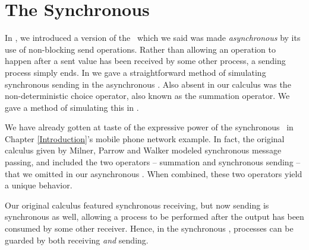 \chapter{The Synchronous \Picalc}\label{sync_and_express}
In , we introduced a version of the \picalc\ which we said was made \emph{asynchronous} by its use of non-blocking send operations.  
Rather than allowing an operation to happen after a sent value has been received by some other process, a sending process simply ends.  
In  we gave a straightforward method of simulating synchronous sending in the asynchronous \picalc.  
Also absent in our calculus was the non-deterministic choice operator, also known as the summation operator.  
We gave a method of simulating this in .

We have already gotten at taste of the expressive power of the synchronous \picalc\ in Chapter \ref{Introduction}'s mobile phone network example.  In fact, the original calculus given by Milner, Parrow and Walker modeled synchronous message passing, and included the two operators -- summation and synchronous sending -- that we omitted in our asynchronous \picalc.  
When combined, these two operators yield a unique behavior.

Our original calculus featured synchronous receiving, but now sending is synchronous as well, allowing a process to be performed after the output has been consumed by some other receiver.  
Hence, in the synchronous \picalc, processes can be guarded by both receiving \emph{and} sending.  


